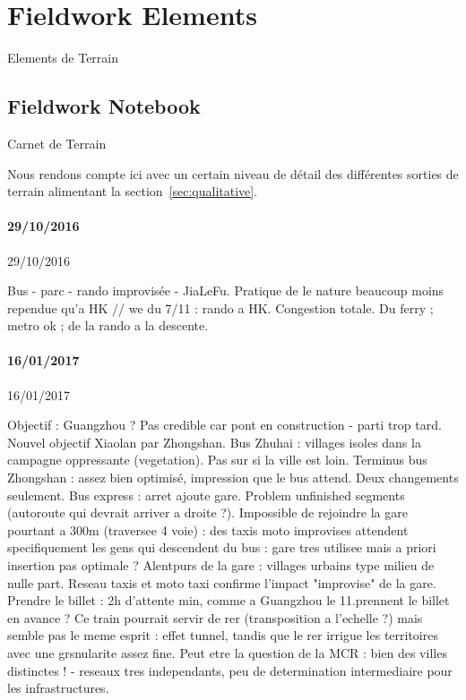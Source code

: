 




\section{Fieldwork Elements}{Elements de Terrain}


\subsection{Fieldwork Notebook}{Carnet de Terrain}

Nous rendons compte ici avec un certain niveau de détail des différentes sorties de terrain alimentant la section~\ref{sec:qualitative}.




\paragraph{29/10/2016}{29/10/2016}

Bus - parc - rando improvisée - JiaLeFu.
Pratique de le nature beaucoup moins rependue qu'a HK
// we du 7/11 : rando a HK. Congestion totale. Du ferry ; metro ok ; de la rando a la descente.

\paragraph{16/01/2017}{16/01/2017}

Objectif : Guangzhou ? Pas credible car pont en construction - parti trop tard. Nouvel objectif Xiaolan par Zhongshan. Bus Zhuhai : villages isoles dans la campagne oppressante (vegetation). Pas sur si la ville est loin. Terminus bus Zhongshan : assez bien optimisé, impression que le bus attend. Deux changements seulement. Bus express : arret ajoute gare. Problem unfinished segments (autoroute qui devrait arriver a droite ?). Impossible de rejoindre la gare pourtant a 300m (traversee 4 voie) : des taxis moto improvises attendent specifiquement les gens qui descendent du bus : gare tres utilisee mais a priori insertion pas optimale ? Alentpurs de la gare : villages urbains type milieu de nulle part. Reseau taxis et moto taxi confirme l'impact "improvise" de la gare. Prendre le billet : 2h d'attente min, comme a Guangzhou le 11.prennent le billet en avance ? Ce train pourrait servir de rer (transposition a l'echelle ?) mais semble pas le meme esprit : effet tunnel, tandis que le rer irrigue les territoires avec une grsnularite assez fine. Peut etre la question de la MCR : bien des villes distinctes ! - reseaux tres independants, peu de determination intermediaire pour les infrastructures.

